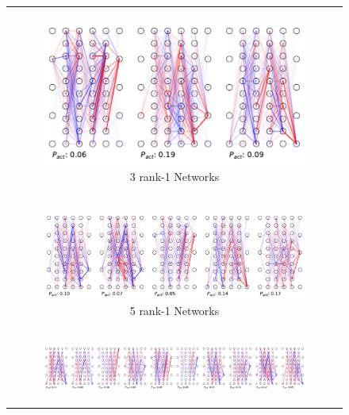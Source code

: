 \documentclass{article}
\theoremstyle{plain}
\theoremstyle{definition}
\theoremstyle{remark}
\begin{document}
\begin{figure}[ht]
    \centering
    \caption{Decomposing the $X \mapsto X^2$ model into different numbers of subnetworks}\label{fig:s10_squared_decompositions_features}
    \begin{minipage}{\textwidth} %
        \centering
        \begin{tabular}{c}  %
            \begin{subfigure}{0.3\textwidth}
                \centering
                \includegraphics[width=\linewidth]{../figures/s10_squared_decompositions_feature3.pdf}
                \caption{3 rank-1 Networks}
            \end{subfigure} \\
            \begin{subfigure}{0.3\textwidth}
                \centering
                \includegraphics[width=\linewidth]{../figures/s10_squared_decompositions_feature5.pdf}
                \caption{5 rank-1 Networks}
            \end{subfigure} \\ %
            \begin{subfigure}{0.3\textwidth}
                \centering
                \includegraphics[width=\linewidth]{../figures/s10_squared_decompositions_feature10.pdf}

\end{subfigure}
\end{tabular}
\end{minipage}
\end{figure}
\end{document}
